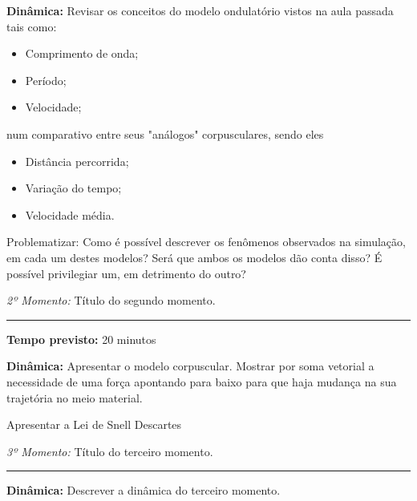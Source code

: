     \noindent \textbf{Dinâmica:} Revisar os conceitos do modelo ondulatório vistos na aula passada tais como:

    \begin{itemize}
        \item Comprimento de onda;
        \item Período;
        \item Velocidade;
    \end{itemize}
    num comparativo entre seus "análogos" corpusculares, sendo eles
    \begin{itemize}
        \item Distância percorrida;
        \item Variação do tempo;
        \item Velocidade média.
    \end{itemize}

    Problematizar: Como é possível descrever os fenômenos observados na simulação, em cada um destes modelos? Será que ambos os modelos dão conta disso? É possível privilegiar um, em detrimento do outro? 

    \vspace{50pt}
    \noindent \emph{2º Momento:} Título do segundo momento.
	\par\noindent\rule{.3\textwidth}{.5pt}    
    \par\noindent \textbf{Tempo previsto: }20 minutos
	

    \noindent \textbf{Dinâmica:} Apresentar o modelo corpuscular. Mostrar por soma vetorial a necessidade de uma força apontando para baixo para que haja mudança na sua trajetória no meio material.

    Apresentar a Lei de Snell Descartes


	\vspace{50pt}
    \noindent \emph{3º Momento:} Título do terceiro momento.
	\par\noindent\rule{.3\textwidth}{.5pt}
    \par\noindent \textbf{Dinâmica:} Descrever a dinâmica do terceiro momento.

